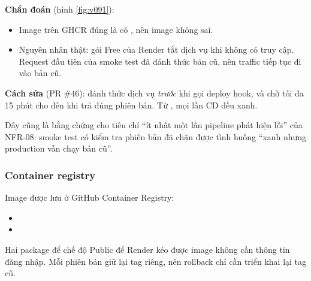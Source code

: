 \textbf{Chẩn đoán} (hình \ref{fig:v091}):
\begin{itemize}
\item Image  trên GHCR đúng là có , nên image không sai.
\item Nguyên nhân thật: gói Free của Render tắt dịch vụ khi không có truy cập. Request đầu tiên của smoke test đã đánh thức bản cũ, nên traffic tiếp tục đi vào bản cũ.
\end{itemize}

\textbf{Cách sửa} (PR \#46): đánh thức dịch vụ \emph{trước} khi gọi deploy hook, và chờ tối đa 15 phút cho đến khi  trả đúng phiên bản. Từ , mọi lần CD đều xanh.

Đây cũng là bằng chứng cho tiêu chí ``ít nhất một lần pipeline phát hiện lỗi'' của NFR-08: smoke test có kiểm tra phiên bản đã chặn được tình huống ``xanh nhưng production vẫn chạy bản cũ''.


\subsubsection{Container registry}
Image được lưu ở GitHub Container Registry:
\begin{itemize}
\item {}
\item {}
\end{itemize}

Hai package để chế độ Public để Render kéo được image không cần thông tin đăng nhập. Mỗi phiên bản giữ lại tag riêng, nên rollback chỉ cần triển khai lại tag cũ.


